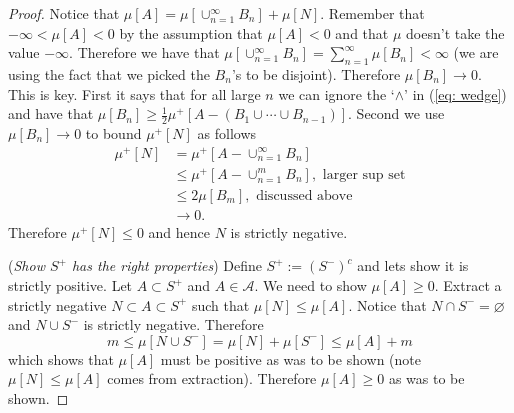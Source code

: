 \begin{shaded}
\begin{proof}
 Notice that $\mu[A]=\mu[\cup_{n=1}^\infty B_n]+\mu[N]$. Remember that  $-\infty<\mu[A]<0$ by the assumption that $\mu[A]<0$ and that $\mu$ doesn't take the value $-\infty$. Therefore we have that $\mu[\cup_{n=1}^\infty B_n] =  \sum_{n=1}^\infty \mu[B_n]<\infty$ (we are using the fact that we picked the $B_n$'s to be disjoint). Therefore $\mu[B_n]\rightarrow 0$. This is key. First it says that for all large $n$ we can ignore the `$\wedge$' in (\ref{eq: wedge}) and have that $\mu[B_n] \geq \frac{1}{2}\mu^+ [A - (B_1\cup \cdots \cup B_{n-1})]$.  Second we use $\mu[B_n]\rightarrow 0$ to bound $\mu^+[N]$ as follows
 \begin{align*}
 \mu^+[N]
 &= \mu^+[A - \cup_{n=1}^\infty B_n] \\
 &\leq \mu^+[A - \cup_{n=1}^m B_n],\,\,\text{larger sup set} \\
 &\leq 2\mu[B_m],\,\,\text{discussed above}\\
 &\rightarrow 0.
 \end{align*}
Therefore $\mu^+[N]\leq 0$ and hence $N$ is strictly negative.


({\it Show  $S^+$ has the right properties}) Define $S^+:=  (S^-)^c$ and lets show it is strictly positive. Let $A\subset S^+$ and $A\in \mathcal A$. We need to  show $\mu[A]\geq 0$. Extract a strictly negative $N\subset A\subset S^+$ such that $\mu[N]\leq \mu[A]$. Notice that $N\cap S^- =\varnothing$ and $N\cup S^-$ is strictly negative. Therefore
\[
m\leq \mu[N\cup S^-]=  \mu[N]+ \mu[S^-]\leq \mu[A] + m
\]
which shows that $\mu[A]$ must be positive as was to be shown (note $\mu[N]\leq \mu[A]$ comes from extraction). Therefore $\mu[A]\geq 0$ as was to be shown.




\end{proof}
\end{shaded}
